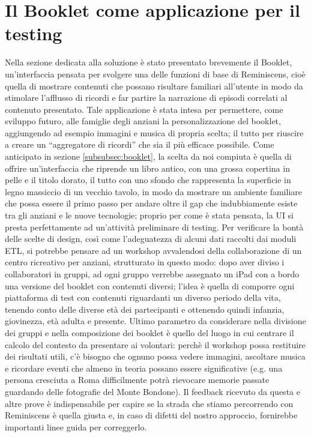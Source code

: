 \documentclass[sigproc-sp.tex]{subfiles}
\begin{document}
\section{Il Booklet come applicazione per il testing}
\label{app:booklet}
Nella sezione dedicata alla soluzione è stato presentato brevemente il Booklet, un’interfaccia pensata per svolgere una delle funzioni di base di Reminiscens, cioè quella di mostrare contenuti che possano risultare familiari all’utente in modo da stimolare l’afflusso di ricordi e far partire la narrazione di episodi correlati al contenuto presentato. Tale applicazione è stata intesa per permettere, come sviluppo futuro, alle famiglie degli anziani la personalizzazione del booklet, aggiungendo ad esempio immagini e musica di propria scelta; il tutto per riuscire a creare un “aggregatore di ricordi” che sia il più efficace possibile. Come anticipato in sezione \ref{subsubsec:booklet}, la scelta da noi compiuta è quella di offrire un’interfaccia che riprende un libro antico, con una grossa copertina in pelle e il titolo dorato, il tutto con uno sfondo che rappresenta la superficie in legno massiccio di un vecchio tavolo, in modo da mostrare un ambiente familiare che possa essere il primo passo per andare oltre il gap che indubbiamente esiste tra gli anziani e le nuove tecnologie; proprio per come è stata pensata, la UI si presta perfettamente ad un’attività preliminare di testing. Per verificare la bontà delle scelte di design, così come l’adeguatezza di alcuni dati raccolti dai moduli ETL, si potrebbe pensare ad un workshop avvalendosi della collaborazione di un centro ricreativo per anziani, strutturato in questo modo: dopo aver diviso i collaboratori in gruppi, ad ogni gruppo verrebbe assegnato un iPad con a bordo una versione del booklet con contenuti diversi; l’idea è quella di comporre ogni piattaforma di test con contenuti riguardanti un diverso periodo della vita, tenendo conto delle diverse età dei partecipanti e ottenendo quindi infanzia, giovinezza, età adulta e presente. Ultimo parametro da considerare nella divisione dei gruppi e nella composizione dei booklet è quello del luogo in cui centrare il calcolo del contesto da presentare ai volontari: perchè il workshop possa restituire dei risultati utili, c’è bisogno che ognuno possa vedere immagini, ascoltare musica e ricordare eventi che almeno in teoria possano essere significative (e.g. una persona cresciuta a Roma difficilmente potrà rievocare memorie passate guardando delle fotografie del Monte Bondone). Il feedback ricevuto da questa e altre prove è indispensabile per capire se la strada che stiamo percorrendo con Reminiscens è quella giusta e, in caso di difetti del nostro approccio, fornirebbe importanti linee guida per correggerlo.
\end{document}
